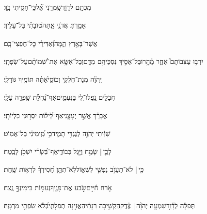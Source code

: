\documentclass[12pt]{article}
\newcommand{\loc}[1]{\textsuperscript{\locf{#1}}}
\begin{document}
\pstart[\subsection*{\textcolor{red}{פרק טז}}]\label{פרק טז}
{\loc{ א}~}‏מִכְתָּ֥ם לְדָוִ֑ד\newline\hspace*{.5em}שָֽׁמְרֵ֥נִי אֵ֝֗ל{\hfill}כִּֽי־חָסִ֥יתִי בָֽךְ׃\par

{\loc{ ב}~}‏אָמַ֣רְתְּ  אֲדֹנָ֣י אָ֑תָּה{\hfill}ט֝וֹבָתִ֗י בַּל־עָלֶֽיךָ׃\par

{\loc{ ג}~}‏ אֲשֶׁר־בָּאָ֣רֶץ הֵ֑מָּה{\hfill}וְ֝אַדִּירֵ֗י כׇּל־חֶפְצִי־בָֽם׃\par

{\loc{ ד}~}‏יִרְבּ֥וּ עַצְּבוֹתָם֮ אַחֵ֢ר מָ֫הָ֥רוּ{\hfill}בַּל־אַסִּ֣יךְ נִסְכֵּיהֶ֣ם מִדָּ֑ם\newline\hspace*{.5em}וּֽבַל־אֶשָּׂ֥א אֶת־שְׁ֝מוֹתָ֗ם{\hfill}עַל־שְׂפָתָֽי׃\par

{\loc{ ה}~}‏יְֽהֹוָ֗ה מְנָת־חֶלְקִ֥י וְכוֹסִ֑י{\hfill}אַ֝תָּ֗ה תּוֹמִ֥יךְ גּוֹרָלִֽי׃\par

{\loc{ ו}~}‏חֲבָלִ֣ים נָֽפְלוּ־לִ֭י בַּנְּעִמִ֑ים{\hfill}אַף־נַ֝חֲלָ֗ת שָֽׁפְרָ֥ה עָלָֽי׃\par

{\loc{ ז}~}‏אֲבָרֵ֗ךְ  אֲשֶׁ֣ר יְעָצָ֑נִי{\hfill}אַף־לֵ֝יל֗וֹת יִסְּר֥וּנִי כִלְיוֹתָֽי׃\par

{\loc{ ח}~}‏שִׁוִּ֬יתִי יְהֹוָ֣ה לְנֶגְדִּ֣י תָמִ֑יד{\hfill}כִּ֥י מִֽ֝ימִינִ֗י בַּל־אֶמּֽוֹט׃\par

{\loc{ ט}~}‏לָכֵ֤ן |  שָׂמַ֣ח  וַיָּ֣גֶל כְּבוֹדִ֑י{\hfill}אַף־בְּ֝שָׂרִ֗י יִשְׁכֹּ֥ן לָבֶֽטַח׃\par

{\loc{ י}~}‏כִּ֤י |  לֹא־תַעֲזֹ֣ב נַפְשִׁ֣י לִשְׁא֑וֹל{\hfill}לֹֽא־תִתֵּ֥ן חֲ֝סִידְךָ֗ לִרְא֥וֹת שָֽׁחַת׃\par

{\loc{ יא}~}‏{\hfill}אֹ֤רַח חַ֫יִּ֥ים\newline\hspace*{.5em}שֹׂ֣בַע  אֶת־פָּנֶ֑יךָ{\hfill}נְעִמ֖וֹת בִּימִינְךָ֣ נֶֽצַח׃\par\pend
\ledpb
\pstart[\subsection*{\textcolor{red}{פרק יז}}]\label{פרק יז}
{\loc{ א}~}‏תְּפִלָּ֗ה לְדָ֫וִ֥ד\newline\hspace*{.5em}שִׁמְעָ֤ה יְהֹוָ֨ה |  צֶ֗דֶק{\hfill}הַקְשִׁ֥יבָה רִנָּתִ֗י\newline\hspace*{.5em}הַאֲזִ֥ינָה תְפִלָּתִ֑י{\hfill}בְּ֝לֹ֗א שִׂפְתֵ֥י מִרְמָֽה׃\par
\end{document}
